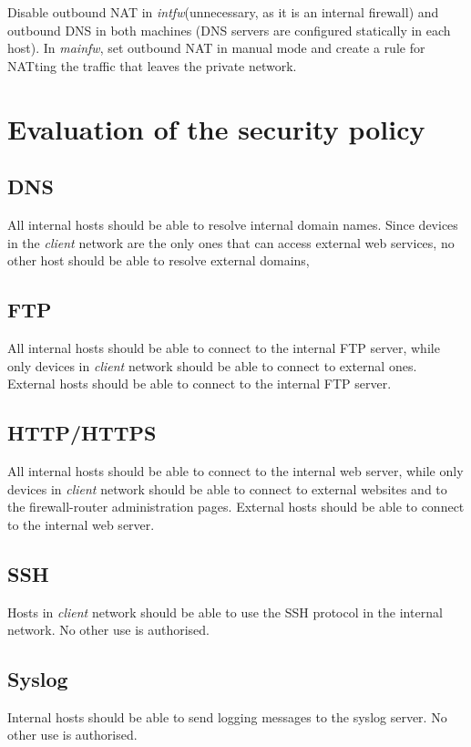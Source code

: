 \documentclass[draft]{homework}
\newcommand{\intfw}{\textit{intfw}\xspace}
\newcommand{\mainfw}{\textit{mainfw}\xspace}
\begin{document}
    Disable outbound NAT in \intfw (unnecessary, as it is an internal firewall) and outbound DNS in both machines (DNS servers are configured statically in each host). In \mainfw, set outbound NAT in manual mode and create a rule for NATting the traffic that leaves the private network.
    
    
    \section{Evaluation of the security policy}
    \subsection{DNS}
    All internal hosts should be able to resolve internal domain names.
    Since devices in the \textit{client} network are the only ones that can access external web services, no other host should be able to resolve external domains,
    
    \subsection{FTP}
    All internal hosts should be able to connect to the internal FTP server, while only devices in \textit{client} network should be able to connect to external ones.
    External hosts should be able to connect to the internal FTP server.
    
    \subsection{HTTP/HTTPS}
    All internal hosts should be able to connect to the internal web server, while only devices in \textit{client} network should be able to connect to external websites and to the firewall-router administration pages.
    External hosts should be able to connect to the internal web server.
    
    \subsection{SSH}
    Hosts in \textit{client} network should be able to use the SSH protocol in the internal network.
    No other use is authorised.
    
    \subsection{Syslog}
    Internal hosts should be able to send logging messages to the syslog server.
    No other use is authorised.
    
\end{document}
